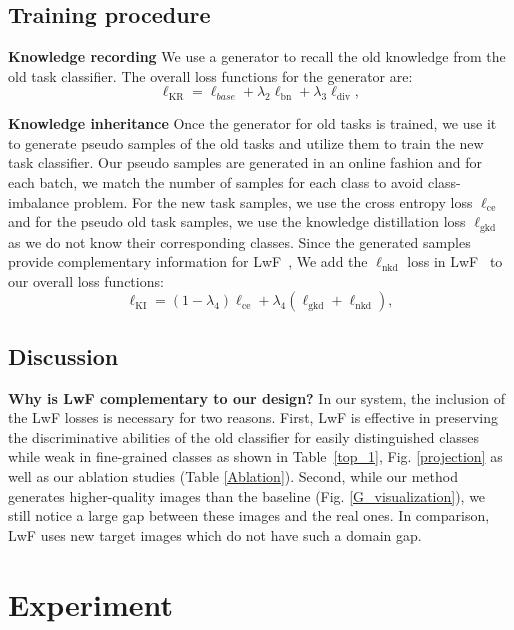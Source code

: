 \documentclass[10pt,twocolumn,letterpaper]{article}
\begin{document}
\subsection{Training procedure}
\textbf{Knowledge recording}
We use a generator to recall the old knowledge from the old task classifier. The overall loss functions for the generator are:
\begin{equation}
\label{stage_one_loss}
    \ell_{\text{KR}} = \ell_{base}+\lambda_2\ell_{\text{bn}} +\lambda_3\ell_{\text{div}},
\end{equation}

\textbf{Knowledge inheritance}
Once the generator for old tasks is trained, we use it to generate pseudo samples of the old tasks and utilize them to train the new task classifier. Our pseudo samples are generated in an online fashion and for each batch, we match the number of samples for each class to avoid class-imbalance problem. For the new task samples, we use the cross entropy loss $\ell_{\text{ce}}$ and for the pseudo old task samples, we use the knowledge distillation loss $\ell_{\text{gkd}}$ as we do not know their corresponding classes. Since the generated samples provide complementary information for LwF~\cite{li2017learning}, We add the $\ell_{\text{nkd}}$ loss in LwF~\cite{li2017learning} to our overall loss functions:
\begin{equation}
\label{stage_two_loss}
    \ell_{\text{KI}} = (1 - \lambda_4)\ell_{\text{ce}} +  \lambda_4(\ell_{\text{gkd}} + \ell_{\text{nkd}}),
\end{equation}

\subsection{Discussion}
\textbf{Why is LwF complementary to our design?} In our system, the inclusion of the LwF losses is necessary for two reasons. First, LwF is effective in preserving the discriminative abilities of the old classifier for easily distinguished classes while weak in fine-grained classes as shown in Table~\ref{top_1}, Fig. \ref{projection} as well as our ablation studies (Table \ref{Ablation}). Second, while our method generates higher-quality images than the baseline (Fig. \ref{G_visualization}), we still notice a large gap between these images and the real ones. In comparison, LwF uses new target images which do not have such a domain gap.

\section{Experiment}
\end{document}
